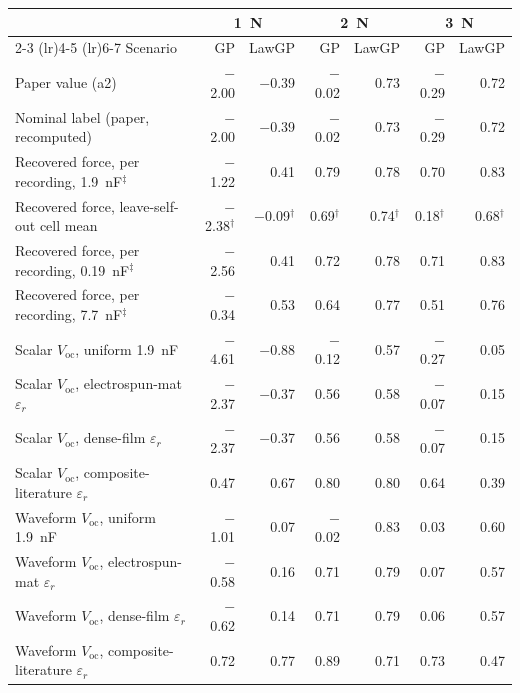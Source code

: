 \begin{tabular}{l rr rr rr}
\toprule
 & \multicolumn{2}{c}{\SI{1}{\newton}} & \multicolumn{2}{c}{\SI{2}{\newton}} & \multicolumn{2}{c}{\SI{3}{\newton}} \\
\cmidrule(lr){2-3} \cmidrule(lr){4-5} \cmidrule(lr){6-7}
Scenario & GP & LawGP & GP & LawGP & GP & LawGP \\
\midrule
Paper value (a2) & $-$2.00 & $-$0.39 & $-$0.02 & 0.73 & $-$0.29 & 0.72 \\
Nominal label (paper, recomputed) & $-$2.00 & $-$0.39 & $-$0.02 & 0.73 & $-$0.29 & 0.72 \\
Recovered force, per recording, \SI{1.9}{\nano\farad}$^\ddagger$ & $-$1.22 & 0.41 & 0.79 & 0.78 & 0.70 & 0.83 \\
Recovered force, leave-self-out cell mean & $-$2.38$^\dagger$ & $-$0.09$^\dagger$ & 0.69$^\dagger$ & 0.74$^\dagger$ & 0.18$^\dagger$ & 0.68$^\dagger$ \\
Recovered force, per recording, \SI{0.19}{\nano\farad}$^\ddagger$ & $-$2.56 & 0.41 & 0.72 & 0.78 & 0.71 & 0.83 \\
Recovered force, per recording, \SI{7.7}{\nano\farad}$^\ddagger$ & $-$0.34 & 0.53 & 0.64 & 0.77 & 0.51 & 0.76 \\
Scalar $V_\mathrm{oc}$, uniform \SI{1.9}{\nano\farad} & $-$4.61 & $-$0.88 & $-$0.12 & 0.57 & $-$0.27 & 0.05 \\
Scalar $V_\mathrm{oc}$, electrospun-mat $\varepsilon_r$ & $-$2.37 & $-$0.37 & 0.56 & 0.58 & $-$0.07 & 0.15 \\
Scalar $V_\mathrm{oc}$, dense-film $\varepsilon_r$ & $-$2.37 & $-$0.37 & 0.56 & 0.58 & $-$0.07 & 0.15 \\
Scalar $V_\mathrm{oc}$, composite-literature $\varepsilon_r$ & 0.47 & 0.67 & 0.80 & 0.80 & 0.64 & 0.39 \\
Waveform $V_\mathrm{oc}$, uniform \SI{1.9}{\nano\farad} & $-$1.01 & 0.07 & $-$0.02 & 0.83 & 0.03 & 0.60 \\
Waveform $V_\mathrm{oc}$, electrospun-mat $\varepsilon_r$ & $-$0.58 & 0.16 & 0.71 & 0.79 & 0.07 & 0.57 \\
Waveform $V_\mathrm{oc}$, dense-film $\varepsilon_r$ & $-$0.62 & 0.14 & 0.71 & 0.79 & 0.06 & 0.57 \\
Waveform $V_\mathrm{oc}$, composite-literature $\varepsilon_r$ & 0.72 & 0.77 & 0.89 & 0.71 & 0.73 & 0.47 \\
\bottomrule
\end{tabular}
